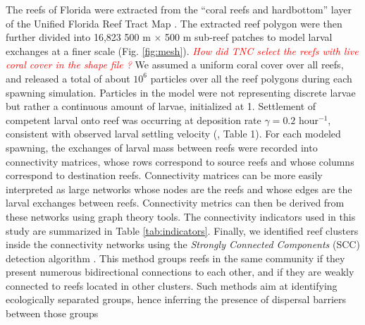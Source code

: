 \documentclass[preprint,12pt,authoryear]{elsarticle}
\newcommand{\emphc}[1]{\emph{\textcolor{red}{#1}}}
\begin{document}
The reefs of Florida were extracted from the “coral reefs and hardbottom” layer of the Unified Florida Reef Tract Map \citep{fwc2017unified}. The extracted reef polygon were then further divided into 16,823 500 m $\times$ 500 m sub-reef patches to model larval exchanges at a finer scale (Fig. \ref{fig:mesh}). \emphc{How did TNC select the reefs with live coral cover in the shape file ?} We assumed a uniform coral cover over all reefs, and released a total of about $10^6$ particles over all the reef polygons during each spawning simulation. Particles in the model were not representing discrete larvae but rather a continuous amount of larvae, initialized at 1. Settlement of competent larval onto reef was occurring at deposition rate $\gamma = 0.2$ hour$^{-1}$, consistent with observed larval settling velocity (\citealp{hata2017coral}, Table 1). For each modeled spawning, the exchanges of larval mass between reefs were recorded into connectivity matrices, whose rows correspond to source reefs and whose columns correspond to destination reefs. Connectivity matrices can be more easily interpreted as large networks whose nodes are the reefs and whose edges are the larval exchanges between reefs. Connectivity metrics can then be derived from these networks using graph theory tools. The connectivity indicators used in this study are summarized in Table \ref{tab:indicators}. Finally, we identified reef clusters inside the connectivity networks using the \textit{Strongly Connected Components} (SCC) detection algorithm \citep{nuutila1994finding}. This method groups reefs in the same community if they present numerous bidirectional connections to each other, and if they are weakly connected to reefs located in other clusters. Such methods aim at identifying ecologically separated groups, hence inferring the presence of dispersal barriers between those groups \citep{thomas2014numerical,saint2023biophysical}
\end{document}
